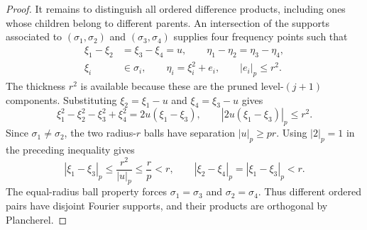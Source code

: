 \documentclass[11pt,twoside,a4paper]{article}
\numberwithin{equation}{section}
\theoremstyle{definition}
\begin{document}
\begin{proof}
It remains to distinguish all ordered difference products, including ones whose children belong to different parents. An intersection of the supports associated to $(\sigma_1,\sigma_2)$ and $(\sigma_3,\sigma_4)$ supplies four frequency points such that
$$
\begin{aligned}
\xi_1-\xi_2&=\xi_3-\xi_4=u,\qquad
\eta_1-\eta_2=\eta_3-\eta_4,\\
\xi_i&\in\sigma_i,\qquad \eta_i=\xi_i^2+e_i,\qquad |e_i|_p\le r^2.
\end{aligned}
$$
The thickness $r^2$ is available because these are the pruned level-$(j+1)$ components. Substituting $\xi_2=\xi_1-u$ and $\xi_4=\xi_3-u$ gives
$$
\xi_1^2-\xi_2^2-\xi_3^2+\xi_4^2=2u(\xi_1-\xi_3),
\qquad |2u(\xi_1-\xi_3)|_p\le r^2.
$$
Since $\sigma_1\ne\sigma_2$, the two radius-$r$ balls have separation $|u|_p\ge pr$. Using $|2|_p=1$ in the preceding inequality gives
$$
|\xi_1-\xi_3|_p\le\frac{r^2}{|u|_p}
\le\frac{r}{p}<r,\qquad
|\xi_2-\xi_4|_p=|\xi_1-\xi_3|_p<r.
$$
The equal-radius ball property forces $\sigma_1=\sigma_3$ and $\sigma_2=\sigma_4$. Thus different ordered pairs have disjoint Fourier supports, and their products are orthogonal by Plancherel.
\end{proof}
\end{document}
